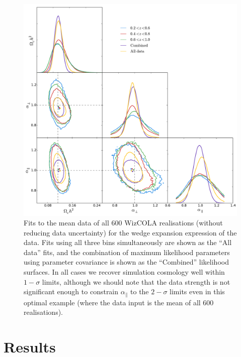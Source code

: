 \documentclass[titlesmallcaps, examinerscopy, copyrightpage]{uqthesis}
\begin{document}
\begin{figure}[h!]
  \begin{center}
    \includegraphics[width=\textwidth]{images/corCombinedWedgeWiz.pdf}
  \end{center}
  \caption{Fits to the mean data of all 600 WizCOLA realisations (without reducing data uncertainty) for the wedge expansion expression of the data. Fits using all three bins simultaneously are shown as the ``All data'' fits, and the combination of maximum likelihood parameters using parameter covariance is shown as the ``Combined'' likelihood surfaces. In all cases we recover simulation cosmology well within $1-\sigma$ limits, although we should note that the data strength is not significant enough to constrain $\alpha_\parallel$ to the $2-\sigma$ limits even in this optimal example (where the data input is the mean of all 600 realisations).}
  \label{fig:corCombinedWedgeWiz}
\end{figure}









\chapter{Results}
\end{document}
